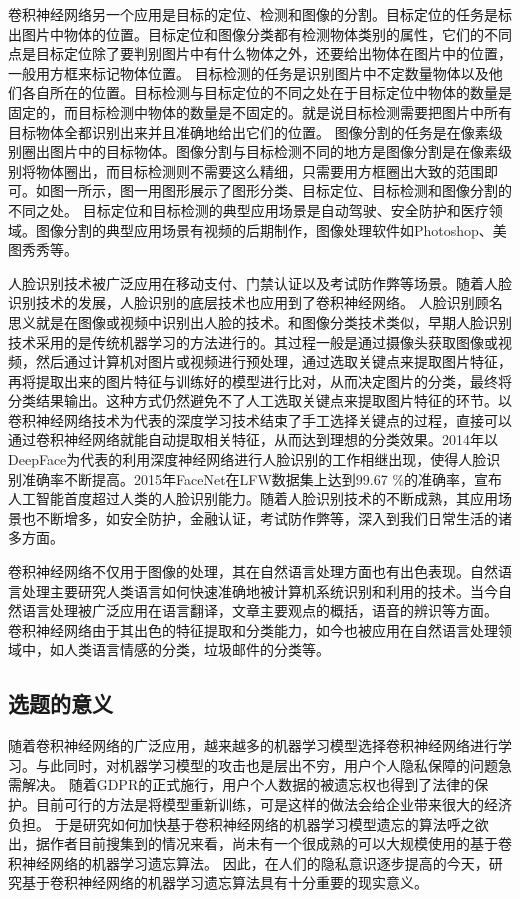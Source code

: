 卷积神经网络另一个应用是目标的定位、检测和图像的分割。目标定位的任务是标出图片中物体的位置。目标定位和图像分类都有检测物体类别的属性，它们的不同点是目标定位除了要判别图片中有什么物体之外，还要给出物体在图片中的位置，一般用方框来标记物体位置。
目标检测的任务是识别图片中不定数量物体以及他们各自所在的位置。目标检测与目标定位的不同之处在于目标定位中物体的数量是固定的，而目标检测中物体的数量是不固定的。就是说目标检测需要把图片中所有目标物体全都识别出来并且准确地给出它们的位置。
图像分割的任务是在像素级别圈出图片中的目标物体。图像分割与目标检测不同的地方是图像分割是在像素级别将物体圈出，而目标检测则不需要这么精细，只需要用方框圈出大致的范围即可。如图一所示，图一用图形展示了图形分类、目标定位、目标检测和图像分割的不同之处。
目标定位和目标检测的典型应用场景是自动驾驶、安全防护和医疗领域。图像分割的典型应用场景有视频的后期制作，图像处理软件如Photoshop、美图秀秀等。

人脸识别技术被广泛应用在移动支付、门禁认证以及考试防作弊等场景。随着人脸识别技术的发展，人脸识别的底层技术也应用到了卷积神经网络。
人脸识别顾名思义就是在图像或视频中识别出人脸的技术。和图像分类技术类似，早期人脸识别技术采用的是传统机器学习的方法进行的。其过程一般是通过摄像头获取图像或视频，然后通过计算机对图片或视频进行预处理，通过选取关键点来提取图片特征，再将提取出来的图片特征与训练好的模型进行比对，从而决定图片的分类，最终将分类结果输出。这种方式仍然避免不了人工选取关键点来提取图片特征的环节。以卷积神经网络技术为代表的深度学习技术结束了手工选择关键点的过程，直接可以通过卷积神经网络就能自动提取相关特征，从而达到理想的分类效果。2014年以DeepFace为代表的利用深度神经网络进行人脸识别的工作相继出现，使得人脸识别准确率不断提高。2015年FaceNet在LFW数据集上达到99.67 $\%$的准确率，宣布人工智能首度超过人类的人脸识别能力。随着人脸识别技术的不断成熟，其应用场景也不断增多，如安全防护，金融认证，考试防作弊等，深入到我们日常生活的诸多方面。

卷积神经网络不仅用于图像的处理，其在自然语言处理方面也有出色表现。自然语言处理主要研究人类语言如何快速准确地被计算机系统识别和利用的技术。当今自然语言处理被广泛应用在语言翻译，文章主要观点的概括，语音的辨识等方面。
卷积神经网络由于其出色的特征提取和分类能力，如今也被应用在自然语言处理领域中，如人类语言情感的分类，垃圾邮件的分类等。

\subsection{选题的意义}
随着卷积神经网络的广泛应用，越来越多的机器学习模型选择卷积神经网络进行学习。与此同时，对机器学习模型的攻击也是层出不穷，用户个人隐私保障的问题急需解决。
随着GDPR的正式施行，用户个人数据的被遗忘权也得到了法律的保护。目前可行的方法是将模型重新训练，可是这样的做法会给企业带来很大的经济负担。
于是研究如何加快基于卷积神经网络的机器学习模型遗忘的算法呼之欲出，据作者目前搜集到的情况来看，尚未有一个很成熟的可以大规模使用的基于卷积神经网络的机器学习遗忘算法。
因此，在人们的隐私意识逐步提高的今天，研究基于卷积神经网络的机器学习遗忘算法具有十分重要的现实意义。
